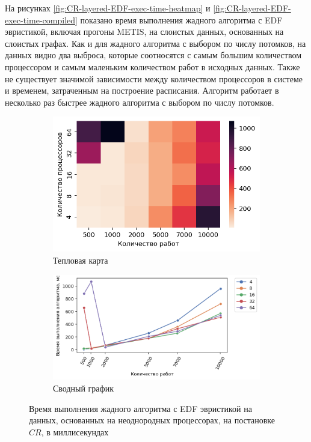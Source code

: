 На рисунках \ref{fig:CR-layered-EDF-exec-time-heatmap} и \ref{fig:CR-layered-EDF-exec-time-compiled} показано время выполнения жадного алгоритма с EDF эвристикой, включая прогоны METIS, на слоистых данных, основанных на слоистых графах. Как и для жадного алгоритма с выбором по числу потомков, на данных видно два выброса, которые соотносятся с самым большим количеством процессором и самым маленьким количеством работ в исходных данных. Также не существует значимой зависимости между количеством процессоров в системе и временем, затраченным на построение расписания. Алгоритм работает в несколько раз быстрее жадного алгоритма с выбором по числу потомков.

\begin{figure}[!htbp]
    \centering
    \begin{subfigure}{0.49\textwidth}
        \includegraphics[width=\textwidth]{imgs/unbalanced/CR_EDF/et_heatmap.png}
        \caption{Тепловая карта}
        \label{fig:CR-unbalanced-EDF-exec-time-heatmap}
    \end{subfigure}
    \hfill
    \begin{subfigure}{0.49\textwidth}
        \includegraphics[width=\textwidth]{imgs/unbalanced/CR_EDF/tr_graph.png}
        \caption{Сводный график}
        \label{fig:CR-unbalanced-EDF-exec-time-compiled}
    \end{subfigure}
    \caption{Время выполнения жадного алгоритма с EDF эвристикой на данных, основанных на неоднородных процессорах, на постановке $CR$, в миллисекундах}
\end{figure}

